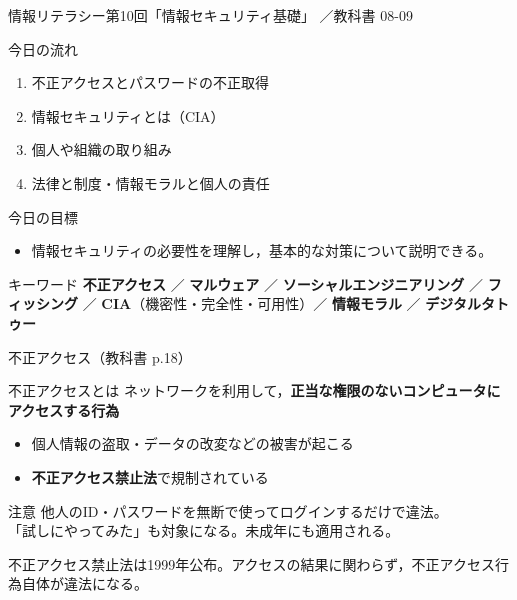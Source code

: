 \documentclass[aspectratio=43,professionalfonts,handout,10pt]{beamer}
\newcommand{\LectureNum}{10}
\newcommand{\LectureTitle}{情報セキュリティ基礎}
\newcommand{\CourseName}{情報リテラシー}
\newcommand{\TextPages}{08-09}
\begin{document}

\begin{frame}{\CourseName\quad 第\LectureNum 回「\LectureTitle 」}
  {\small \TermName\quad \TeacherName\quad ／\quad 教科書 \TextPages}

  \vfill

  \begin{block}{今日の流れ}
    \begin{enumerate}
      \item 不正アクセスとパスワードの不正取得
      \item 情報セキュリティとは（CIA）
      \item 個人や組織の取り組み
      \item 法律と制度・情報モラルと個人の責任
    \end{enumerate}
  \end{block}
  \vfill

  \begin{block}{今日の目標}
    \begin{itemize}
      \item 情報セキュリティの必要性を理解し，基本的な対策について説明できる。
    \end{itemize}
  \end{block}
  \vfill

  \begin{exampleblock}{キーワード}
    \small \textbf{不正アクセス} ／ \textbf{マルウェア} ／ \textbf{ソーシャルエンジニアリング} ／ \textbf{フィッシング} ／ \textbf{CIA}（機密性・完全性・可用性）／ \textbf{情報モラル} ／ \textbf{デジタルタトゥー}
  \end{exampleblock}
\end{frame}


\begin{frame}{不正アクセス（教科書 p.18）}
  \begin{block}{不正アクセスとは}
    ネットワークを利用して，\textbf{正当な権限のないコンピュータにアクセスする行為}
    \begin{itemize}
      \item 個人情報の盗取・データの改変などの被害が起こる
      \item \textbf{不正アクセス禁止法}で規制されている
    \end{itemize}
  \end{block}

  \vfill

  \begin{alertblock}{注意}
    他人のID・パスワードを無断で使ってログインするだけで違法。\\
    「試しにやってみた」も対象になる。未成年にも適用される。
  \end{alertblock}

  \begin{slidenote}
    不正アクセス禁止法は1999年公布。アクセスの結果に関わらず，不正アクセス行為自体が違法になる。
  \end{slidenote}
\end{frame}
\end{document}
